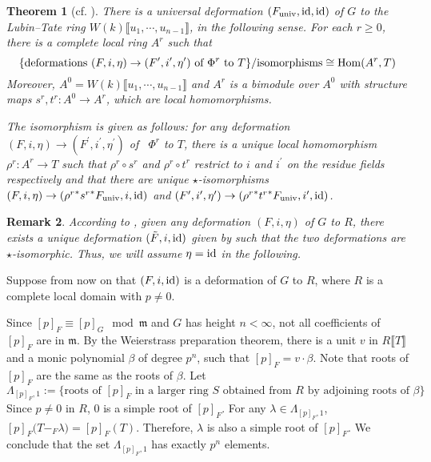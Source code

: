 \documentclass[12pt]{article}
\newtheorem{theorem}{Theorem}[section]
\newtheorem{remark}[theorem]{Remark}
\theoremstyle{definition}
\newcommand{\PS}[1]{\llbracket #1 \rrbracket}
\def\Hom{{\rm Hom}}
\def\m{\mathfrak{m}}
\begin{document}
    \begin{theorem} [{{cf. \cite[Theorem 42]{Str97}}}] \label{classification of def of Frob}
        There is a universal deformation $(F_{\rm univ},{\rm id},{\rm id})$ of $G$ to the Lubin--Tate ring $W(k)\PS{u_1,\cdots,u_{n-1}}$, in the following sense. For each $r \geqslant 0$, there is a complete local ring $A^r$ such that 
        \begin{equation*}
            \{\mbox{deformations } (F,i,\eta) \to (F^\prime,i^\prime,\eta^\prime) \mbox{ of } \Phi^r \mbox{ to } T\}/\mbox{isomorphisms} \cong \Hom(A^r,T)
        \end{equation*}
        Moreover, $A^0 = W(k)\PS{u_1,\cdots,u_{n-1}}$ and $A^r$ is a bimodule over $A^0$ with structure maps $s^r,t^r \colon A^0 \to A^r$, which are local homomorphisms. \par 
        The isomorphism is given as follows: for any deformation $(F,i,\eta) \to (F^\prime,i^\prime,\eta^\prime)$ of \ $\Phi^r$ to $T$, there is a unique local homomorphism $\rho^r \colon A^r \to T$ such that $\rho^r \circ s^r$ and $\rho^r \circ t^r$ restrict to $i$ and $i^\prime$ on the residue fields respectively and that there are unique $\star$-isomorphisms $(F,i,\eta) \to ({\rho^r}^*{s^r}^*F_{\rm univ},i,\rm{id})$ and $(F^\prime,i^\prime,\eta^\prime) \to ({\rho^r}^*{t^r}^*F_{\rm univ}, i^\prime, {\rm id})$.
    \end{theorem}
    \begin{remark} \label{rmk: eta to id}
        According to \cite[Remark 6.2]{Zhu20}, given any deformation $(F,i,\eta)$ of $G$ to $R$, there exists a unique deformation $(\tilde{F},i,\rm{id})$ given by \cite[Theorem 3.1]{LT66} such that the two deformations are $\star$-isomorphic. Thus, we will assume $\eta = \rm{id}$ in the following.
   \end{remark} 
    Suppose from now on that $(F,i,\rm{id})$ is a deformation of $G$ to $R$, where $R$ is a complete local domain with $p \neq 0$. \par 
    Since $[p]_F \equiv [p]_G \mod{\m}$ and $G$ has height $n < \infty$, not all coefficients of $[p]_F$ are in $\m$. By the Weierstrass preparation theorem, there is a unit $v$ in $R\PS{T}$ and a monic polynomial $\beta$ of degree $p^n$, such that $[p]_F = v \cdot \beta$. Note that roots of $[p]_F$ are the same as the roots of $\beta$. Let
    \begin{equation} \label{def of lambda_p,1}
        \Lambda_{[p]_F,1} := \{\mbox{roots of $[p]_F$ in a larger ring $S$ obtained from $R$ by adjoining roots of $\beta$}\}
    \end{equation}
    Since $p \neq 0$ in $R$, $0$ is a simple root of $[p]_F$. For any $\lambda \in \Lambda_{[p]_F,1}$, $[p]_F\bigl(T -_F \lambda\bigr) = [p]_F(T)$. Therefore, $\lambda$ is also a simple root of $[p]_F$. We conclude that the set $\Lambda_{[p]_F,1}$ has exactly $p^n$ elements. 
   
\end{document}

